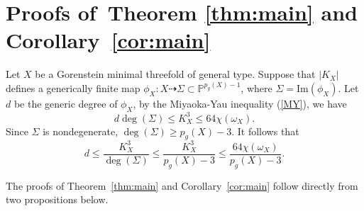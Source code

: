 \documentclass[11pt]{amsart}
\theoremstyle{plain}
\theoremstyle{definition}
\numberwithin{equation}{section}
\newcommand{\im}{\mathrm{Im}}
\newcommand{\PP}{\mathbb{P}}
\newcommand{\sO}{\mathcal{O}}
\begin{document}
\section{Proofs of~Theorem \ref{thm:main} and Corollary~\ref{cor:main}} 
Let $X$ be a Gorenstein minimal  threefold of general type. Suppose that $|K_X|$ defines a generically finite map $\phi_X\colon X\dashrightarrow \Sigma\subset\PP^{p_g(X)-1}$, where $\Sigma=\im(\phi_X)$.  Let $d$ be the generic degree of $\phi_X$,
by the Miyaoka-Yau inequality (\ref{MY}), we have
\[
d\deg(\Sigma)\leq K_X^3\leq 64\chi(\omega_X).
\]
Since $\Sigma$ is nondegenerate, $\deg(\Sigma)\geq p_g(X)-3$. It follows that
\begin{equation}\label{MY-bound}
    d\leq \frac{K_X^3}{\deg(\Sigma)}\leq \frac{K_X^3}{p_g(X)-3}\leq \frac{64\chi(\omega_X)}{p_g(X)-3}.
\end{equation}


The proofs of Theorem~\ref{thm:main} and Corollary~\ref{cor:main} follow directly from  two propositions below.
\end{document}
